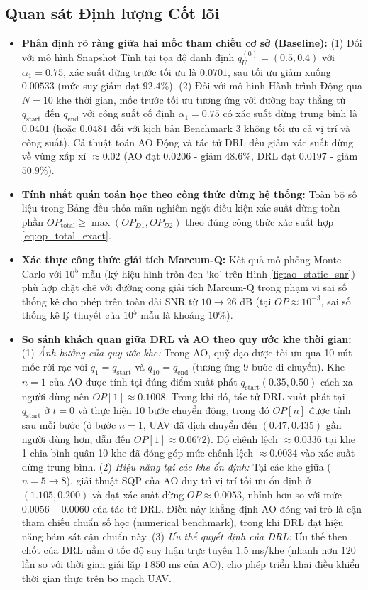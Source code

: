 \subsection*{Quan sát Định lượng Cốt lõi}
\begin{itemize}[leftmargin=1.5em]
    \item \textbf{Phân định rõ ràng giữa hai mốc tham chiếu cơ sở (Baseline):} 
    (1) Đối với mô hình Snapshot Tĩnh tại tọa độ danh định $q_U^{(0)}=(0.5, 0.4)$ với $\alpha_1=0.75$, xác suất dừng trước tối ưu là $0.0701$, sau tối ưu giảm xuống $0.00533$ (mức suy giảm đạt $92.4\%$).
    (2) Đối với mô hình Hành trình Động qua $N=10$ khe thời gian, mốc trước tối ưu tương ứng với đường bay thẳng từ $q_{\text{start}}$ đến $q_{\text{end}}$ với công suất cố định $\alpha_1=0.75$ có xác suất dừng trung bình là $0.0401$ (hoặc $0.0481$ đối với kịch bản Benchmark 3 không tối ưu cả vị trí và công suất). Cả thuật toán AO Động và tác tử DRL đều giảm xác suất dừng về vùng xấp xỉ $\approx 0.02$ (AO đạt $0.0206$ - giảm $48.6\%$, DRL đạt $0.0197$ - giảm $50.9\%$).
    \item \textbf{Tính nhất quán toán học theo công thức dừng hệ thống:} Toàn bộ số liệu trong Bảng đều thỏa mãn nghiêm ngặt điều kiện xác suất dừng toàn phần $OP_{\text{total}} \ge \max(OP_{D1}, OP_{D2})$ theo đúng công thức xác suất hợp \eqref{eq:op_total_exact}.
    \item \textbf{Xác thực công thức giải tích Marcum-Q:} Kết quả mô phỏng Monte-Carlo với $10^5$ mẫu (ký hiệu hình tròn đen `ko' trên Hình \ref{fig:ao_static_snr}) phù hợp chặt chẽ với đường cong giải tích Marcum-Q trong phạm vi sai số thống kê cho phép trên toàn dải SNR từ $10 \to 26$ dB (tại $OP \approx 10^{-3}$, sai số thống kê lý thuyết của $10^5$ mẫu là khoảng $10\%$).
    \item \textbf{So sánh khách quan giữa DRL và AO theo quy ước khe thời gian:} 
    (1) \textit{Ảnh hưởng của quy ước khe:} Trong AO, quỹ đạo được tối ưu qua 10 nút mốc rời rạc với $q_1 = q_{\text{start}}$ và $q_{10} = q_{\text{end}}$ (tương ứng 9 bước di chuyển). Khe $n=1$ của AO được tính tại đúng điểm xuất phát $q_{\text{start}}(0.35, 0.50)$ cách xa người dùng nên $OP[1] \approx 0.1008$. Trong khi đó, tác tử DRL xuất phát tại $q_{\text{start}}$ ở $t=0$ và thực hiện 10 bước chuyển động, trong đó $OP[n]$ được tính sau mỗi bước (ở bước $n=1$, UAV đã dịch chuyển đến $(0.47, 0.435)$ gần người dùng hơn, dẫn đến $OP[1] \approx 0.0672$). Độ chênh lệch $\approx 0.0336$ tại khe 1 chia bình quân 10 khe đã đóng góp mức chênh lệch $\approx 0.0034$ vào xác suất dừng trung bình.
    (2) \textit{Hiệu năng tại các khe ổn định:} Tại các khe giữa ($n=5 \to 8$), giải thuật SQP của AO duy trì vị trí tối ưu ổn định ở $(1.105, 0.200)$ và đạt xác suất dừng $OP \approx 0.0053$, nhỉnh hơn so với mức $0.0056 - 0.0060$ của tác tử DRL. Điều này khẳng định AO đóng vai trò là cận tham chiếu chuẩn số học (numerical benchmark), trong khi DRL đạt hiệu năng bám sát cận chuẩn này.
    (3) \textit{Ưu thế quyết định của DRL:} Ưu thế then chốt của DRL nằm ở tốc độ suy luận trực tuyến $\mathbf{1.5}$ ms/khe (nhanh hơn $120$ lần so với thời gian giải lặp $1\,850$ ms của AO), cho phép triển khai điều khiển thời gian thực trên bo mạch UAV.
\end{itemize}

